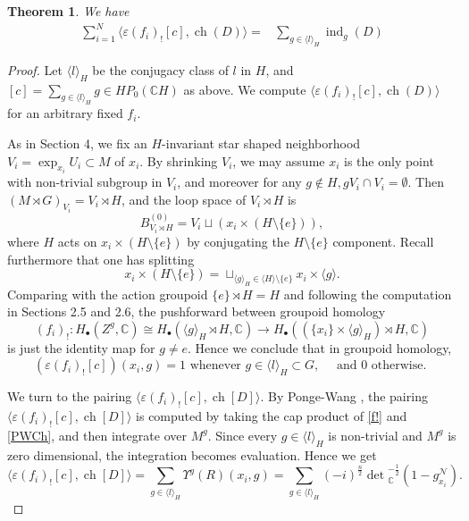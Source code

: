 \documentclass[a4paper]{amsart}
\newcommand{\ch}{\operatorname{ch}}
\newcommand{\CC}{\mathbb C}
\newcommand{\ind}{\operatorname{ind}}
\newcommand\<{\langle}
\renewcommand\>{\rangle}
\newtheorem{thm}[theorem]{Theorem}
\theoremstyle{definition}
\theoremstyle{remark}
\begin{document}
\begin{thm}
We have
\begin{align*}
\sum _{i=1}^N \langle \varepsilon (f _i)_! [c] , \ch (D) \rangle
=& \sum _{g \in \langle l \rangle _H} \ind _g (D) %
\end{align*}
\end{thm}
\begin{proof}
Let $\langle l \rangle _H $ be the conjugacy class of $l$ in $H$, and
$[c] = \sum _{g \in \langle l \rangle _H } g \in H P _0 (\CC H)$ as above.
We compute $\langle \varepsilon (f _i)_! [c] , \ch (D) \rangle$ for an arbitrary fixed $f_i$.

As in Section 4, we fix an $H$-invariant star shaped neighborhood $V _i = \exp _{x_i} U_i \subset M$ of $x_i$.
By shrinking $V _i$,
we may assume $x_i$ is the only point with non-trivial subgroup in $V_i$,
and moreover for any $g \not \in H, g V_i \cap V _i = \emptyset$.
Then $(M \rtimes G) _{V_i} = V _i \rtimes H$, and the loop space of $V_i \rtimes H$ is
$$ B ^{(0)} _{V_i \rtimes H} = V_i \sqcup  (x_i \times (H \setminus \{ e \})), $$
where $H$ acts on $x_i \times (H \setminus \{ e \})$ by conjugating the $H \setminus \{ e \}$ component.
Recall furthermore that one has splitting
$$ x_i \times (H \setminus \{ e \})
= \sqcup _{\langle g \rangle _H \in \langle H \rangle \setminus \{ e \} } x_i \times \langle g \rangle .$$
Comparing with the action groupoid $\{ e \} \rtimes H = H$ and following the computation in Sections 2.5 and 2.6,
the pushforward between groupoid homology
$$(f_i)_! : H _\bullet (Z ^g , \CC) \cong H _\bullet ( \langle g \rangle _H \rtimes H , \CC)
\to H _\bullet ( (\{ x_i \} \times \langle g \rangle _H) \rtimes H , \CC) $$
is just the identity map for $g \neq e$.
Hence we conclude that in groupoid homology,
\begin{equation}
\label{f!}
(\varepsilon (f_i)_! [c] )(x_i , g) = 1 \text{ whenever } g \in \langle l \rangle _H \subset G,
\quad \text{ and $0$ otherwise. }
\end{equation}

We turn to the pairing $\langle \varepsilon (f_i)_! [c] , \ch [ D ] \rangle $.
By Ponge-Wang \cite[Theorem 11.4]{PW18},
the pairing $\langle \varepsilon (f_i)_! [c] , \ch [ D ] \rangle $ is computed by taking the cap product of \eqref{f!}
and \eqref{PWCh}, and then integrate over $M ^g$.
Since every $g \in \langle l \rangle_H$ is non-trivial and $M^g$ is zero dimensional,
the integration becomes evaluation.
Hence we get
\begin{equation}
\label{DisPair}
\langle \varepsilon (f_i)_! [c] , \ch [ D ] \rangle
= \sum _{g \in \langle l \rangle _H} \Upsilon^g (R) (x_i, g)
= \sum _{g \in \langle l \rangle _H}
(-i)^{\frac{n}{2}}\det {}_\CC^{-\frac{1}{2}}(1-g^{\mathcal N}_{x_i}).
\end{equation}


\end{proof}
\end{document}
